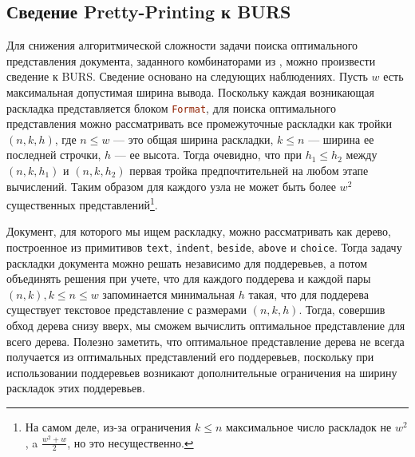 \subsection{Сведение Pretty-Printing к BURS}
Для снижения алгоритмической сложности задачи поиска
оптимального представления документа, заданного комбинаторами из \cite{swierstra},
можно произвести сведение к BURS.
Сведение основано на следующих наблюдениях. Пусть $w$ есть максимальная допустимая
ширина вывода. Поскольку каждая возникающая раскладка представляется блоком
\lstinline[language=Haskell]{Format}, для поиска оптимального представления можно рассматривать
все промежуточные раскладки
как тройки $(n, k, h)$, где $n \le w$ --- это общая ширина раскладки, $k \le n$ ---
ширина ее последней строчки, $h$ --- ее высота. Тогда очевидно, что при $h_1 \le h_2$
между $(n, k, h_1)$ и $(n, k, h_2)$ первая тройка предпочтительней на любом этапе вычислений.
Таким образом для каждого узла не может быть более $w^2$ существенных представлений\footnote{
На самом деле, из-за ограничения $k \le n$ максимальное число раскладок не $w^2$, a
$\frac{w^2 + w}{2}$, но это несущественно.}.

Документ, для которого мы ищем раскладку, можно рассматривать как дерево, построенное из примитивов
\lstinline[language=Haskell]{text},
\lstinline[language=Haskell]{indent},
\lstinline[language=Haskell]{beside},
\lstinline[language=Haskell]{above} и \lstinline[language=Haskell]{choice}. Тогда задачу
раскладки документа можно решать независимо для поддеревьев, а потом объединять решения
при учете, что для каждого поддерева
и каждой пары $(n, k), k \le n \le w$ запоминается минимальная $h$ такая, что для поддерева существует
текстовое представление с размерами $(n, k, h)$. Тогда, совершив обход дерева снизу вверх, мы сможем
вычислить оптимальное представление для всего дерева. Полезно заметить,
что оптимальное представление дерева не всегда получается из оптимальных представлений его
поддеревьев, поскольку при использовании поддеревьев возникают дополнительные
ограничения на ширину раскладок этих поддеревьев.

